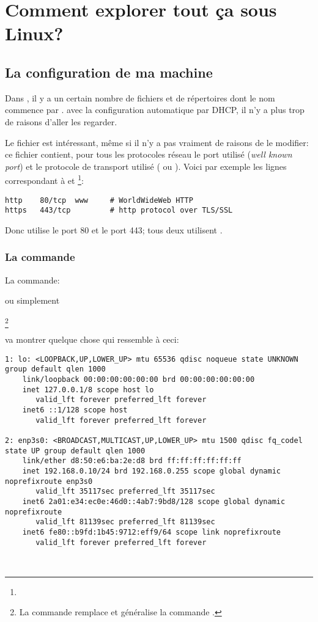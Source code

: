 \section{Comment explorer tout ça sous Linux?}\label{netlinux}
\subsection{La configuration de ma machine}
Dans , il y a un certain nombre de fichiers et de
répertoires dont le nom commence par . avec la
configuration automatique par DHCP, il n'y a plus trop de raisons
d'aller les regarder.

Le fichier  est intéressant, même si il n'y a pas
vraiment de raisons de le modifier: ce fichier contient, pour \og
tous\fg{} les protocoles réseau le port utilisé (\emph{well known
  port}) et le protocole de transport utilisé ( ou
). Voici par exemple les lignes correspondant à  et
\footnote{}:\smallskip

\begin{verbatim}
http	80/tcp	www		# WorldWideWeb HTTP
https	443/tcp			# http protocol over TLS/SSL
\end{verbatim}

Donc  utilise le port 80 et   le port 443; tous deux
utilisent .

\subsubsection{La commande }La commande:


ou simplement

\footnote{La commande
   remplace et généralise la commande .}

va montrer quelque chose qui ressemble à ceci:\smallskip

{\small
\begin{verbatim}
1: lo: <LOOPBACK,UP,LOWER_UP> mtu 65536 qdisc noqueue state UNKNOWN group default qlen 1000
    link/loopback 00:00:00:00:00:00 brd 00:00:00:00:00:00
    inet 127.0.0.1/8 scope host lo
       valid_lft forever preferred_lft forever
    inet6 ::1/128 scope host 
       valid_lft forever preferred_lft forever

2: enp3s0: <BROADCAST,MULTICAST,UP,LOWER_UP> mtu 1500 qdisc fq_codel state UP group default qlen 1000
    link/ether d8:50:e6:ba:2e:d8 brd ff:ff:ff:ff:ff:ff
    inet 192.168.0.10/24 brd 192.168.0.255 scope global dynamic noprefixroute enp3s0
       valid_lft 35117sec preferred_lft 35117sec
    inet6 2a01:e34:ec0e:46d0::4ab7:9bd8/128 scope global dynamic noprefixroute 
       valid_lft 81139sec preferred_lft 81139sec
    inet6 fe80::b9fd:1b45:9712:eff9/64 scope link noprefixroute 
       valid_lft forever preferred_lft forever

    
\end{verbatim}        
}\smallskip

